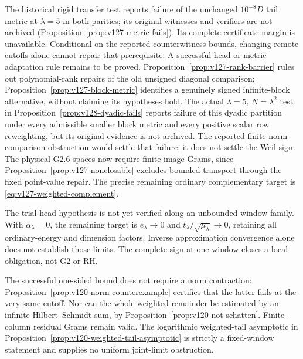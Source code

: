 \documentclass[11pt]{article}
\theoremstyle{remark}
\begin{document}
The historical rigid transfer test reports failure of the unchanged
$10^{-8}D$ tail metric at $\lambda=5$ in both parities; its original
witnesses and verifiers are not archived
(Proposition~\ref{prop:v127-metric-fails}). Its complete certificate
margin is unavailable. Conditional on the reported counterwitness
bounds, changing remote cutoffs alone cannot repair that prerequisite. A successful head or metric adaptation rule
remains to be proved. Proposition~\ref{prop:v127-rank-barrier} rules
out polynomial-rank repairs of the old unsigned diagonal comparison;
Proposition~\ref{prop:v127-block-metric} identifies a genuinely signed
infinite-block alternative, without claiming its hypotheses hold.
The actual $\lambda=5$, $N=\lambda^2$ test in
Proposition~\ref{prop:v128-dyadic-fails} reports failure of this dyadic
partition under every admissible smaller block metric and every
positive scalar row reweighting, but its original evidence is not archived.
The reported finite norm-comparison obstruction would settle that failure; it does not settle the Weil sign.
The physical G2.6 spaces now require finite image Grams, since
Proposition~\ref{prop:v127-nonclosable} excludes bounded transport
through the fixed point-value repair. The precise remaining ordinary
complementary target is \eqref{eq:v127-weighted-complement}.

The trial-head hypothesis is not yet verified along an unbounded
window family. With $\alpha_\lambda=0$, the remaining target is
$e_\lambda\to0$ and $t_\lambda/\sqrt{\mu_\lambda}\to0$, retaining
all ordinary-energy and dimension factors. Inverse approximation
convergence alone does not establish those limits. The complete
sign at one window closes a local obligation, not G2 or RH.

The successful one-sided bound does not require a norm contraction:
Proposition~\ref{prop:v120-norm-counterexample} certifies that the
latter fails at the very same cutoff. Nor can the whole weighted
remainder be estimated by an infinite Hilbert--Schmidt sum, by
Proposition~\ref{prop:v120-not-schatten}. Finite-column residual Grams
remain valid. The logarithmic weighted-tail asymptotic in
Proposition~\ref{prop:v120-weighted-tail-asymptotic} is strictly a
fixed-window statement and supplies no uniform joint-limit obstruction.
\end{document}
